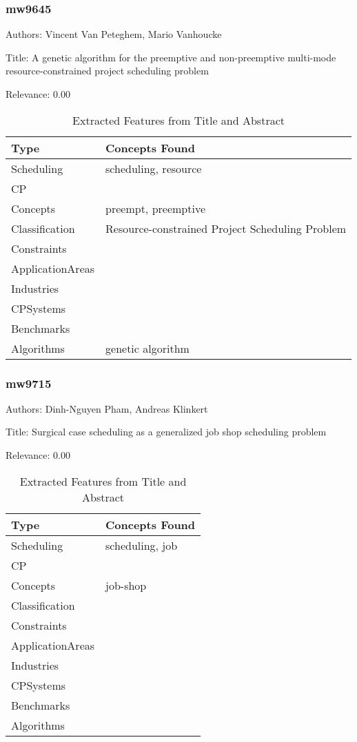 \subsubsection{mw9645}
\label{mw:mw9645}

Authors: Vincent Van Peteghem, Mario Vanhoucke

Title: A genetic algorithm for the preemptive and non-preemptive multi-mode resource-constrained project scheduling problem

Relevance:  0.00

{\scriptsize
\begin{longtable}{p{2cm}p{20cm}}
\caption{Extracted Features from Title and Abstract}\\ \toprule
Type & Concepts Found\\ \midrule
\endhead
\bottomrule
\endfoot
Scheduling & scheduling, resource\\ 
CP & \\ 
Concepts & preempt, preemptive\\ 
Classification & Resource-constrained Project Scheduling Problem\\ 
Constraints & \\ 
ApplicationAreas & \\ 
Industries & \\ 
CPSystems & \\ 
Benchmarks & \\ 
Algorithms & genetic algorithm\\ 
\end{longtable}
}



\subsubsection{mw9715}
\label{mw:mw9715}

Authors: Dinh-Nguyen Pham, Andreas Klinkert

Title: Surgical case scheduling as a generalized job shop scheduling problem

Relevance:  0.00

{\scriptsize
\begin{longtable}{p{2cm}p{20cm}}
\caption{Extracted Features from Title and Abstract}\\ \toprule
Type & Concepts Found\\ \midrule
\endhead
\bottomrule
\endfoot
Scheduling & scheduling, job\\ 
CP & \\ 
Concepts & job-shop\\ 
Classification & \\ 
Constraints & \\ 
ApplicationAreas & \\ 
Industries & \\ 
CPSystems & \\ 
Benchmarks & \\ 
Algorithms & \\ 
\end{longtable}
}




